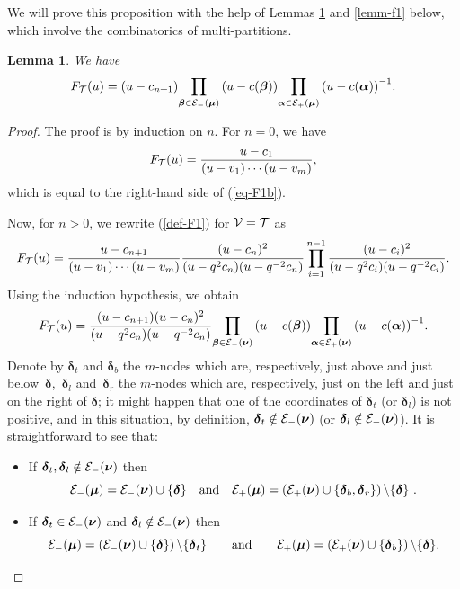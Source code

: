 \documentclass[pdftex]{sigma}
\newcommand{\num}{\boldsymbol{\nu}}
\newcommand{\mum}{\boldsymbol{\mu}}
\newcommand{\alm}{\boldsymbol{\alpha}}
\newcommand{\bem}{\boldsymbol{\beta}}
\newcommand{\dem}{\boldsymbol{\delta}}
\newtheorem{Lemma}[Theorem]{Lemma}
\begin{document}
We will prove this proposition with the help of Lemmas \ref{lemm-f1b} and \ref{lemm-f1} below, which involve the combinatorics of multi-partitions.

\begin{Lemma}\label{lemm-f1b} We have
\begin{gather}\label{eq-F1b}
F_{{\cal{T}}}(u)=(u-c_{n+1}) {\prod_{\bem\in {\cal{E}}_-(\mum)}\left(u-c(\bem)\right)} {\prod_{\alm\in {\cal{E}}_+(\mum)}\left(u-c(\alm)\right)^{-1}}  .
\end{gather}
\end{Lemma}

\begin{proof}
 The proof  is by induction on $n$. For $n=0$, we have
\[
F_{{\cal{T}}}(u)=\frac{u-c_1}{(u-v_1)\cdots(u-v_m)},
\]
which is equal to the right-hand side of (\ref{eq-F1b}).


Now, for $n>0$, we rewrite (\ref{def-F1}) for ${\cal{V}}={\cal{T}}$ as
\[
F_{{\cal{T}}}(u)=\frac{u-c_{n+1}}{(u-v_1)\cdots(u-v_m)}\frac{(u-c_n)^2}{(u-q^2c_n)(u-q^{-2}c_n)}\prod_{i=1}^{n-1}\frac{(u-c_i)^2}{(u-q^2c_i)(u-q^{-2}c_i)}  .
\]
Using the induction hypothesis, we obtain
\begin{gather}\label{eq-F1c}
F_{{\cal{T}}}(u)=\frac{(u-c_{n+1})(u-c_n)^2}{(u-q^2c_n)(u-q^{-2}c_n)}
{\prod_{\bem\in {\cal{E}}_-(\num)}\left(u-c(\bem)\right)} {\prod_{\alm\in {\cal{E}}_+(\num)}\left(u-c(\alm)\right)^{-1}}  .
\end{gather}
Denote by $\dem_t$ and $\dem_b$ the $m$-nodes which are, respectively, just above and just below~$\dem$,~$\dem_l$ and~$\dem_r$ the $m$-nodes which are, respectively, just on the left and just on the right of $\dem$; it might happen that one of the coordinates of $\dem_t$ (or $\dem_l$) is not positive, and in this situation, by def\/inition, $\dem_t\notin {\cal{E}}_-(\num)$ (or $\dem_l\notin {\cal{E}}_-(\num)$).
It is straightforward to see that:
\begin{itemize}\itemsep=0pt
\item If $\dem_t,\dem_l\notin {\cal{E}}_-(\num)$ then \[{\cal{E}}_-(\mum)={\cal{E}}_-(\num)\cup\{\dem\}\quad\textrm{and}\quad {\cal{E}}_+(\mum)=\left({\cal{E}}_+(\num)\cup\{\dem_b,\dem_r\}\right)\backslash\{\dem\}\ .\]

\item If $\dem_t\in {\cal{E}}_-(\num)$ and $\dem_l\notin {\cal{E}}_-(\num)$ then \[{\cal{E}}_-(\mum)=\left({\cal{E}}_-(\num)\cup\{\dem\}\right)\backslash\{\dem_t\}\qquad\textrm{and}\qquad {\cal{E}}_+(\mum)=\left({\cal{E}}_+(\num)\cup\{\dem_b\}\right)\backslash\{\dem\}  .\]


\end{itemize}
\end{proof}
\end{document}
